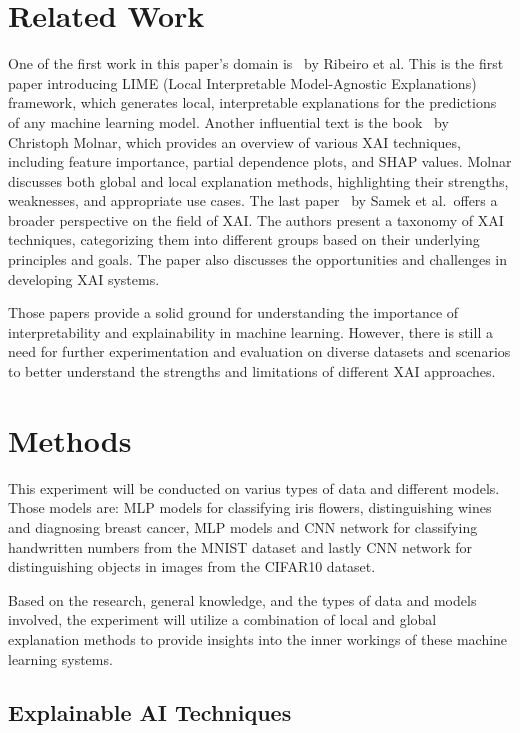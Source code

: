 \documentclass[journal, a4paper]{IEEEtran}
\begin{document}
\section{Related Work}\label{sec:related-work}

One of the first work in this paper's domain is~\cite{ribeiro2016should} by Ribeiro et al.
This is the first paper introducing LIME (Local Interpretable Model-Agnostic Explanations) framework, which generates local, interpretable explanations for the predictions of any machine learning model.
Another influential text is the book~\cite{molnar2019interpretable} by Christoph Molnar, which provides an overview of various XAI techniques, including feature importance, partial dependence plots, and SHAP values.
Molnar discusses both global and local explanation methods, highlighting their strengths, weaknesses, and appropriate use cases.
The last paper~\cite{samek2017explainable} by Samek et al.\ offers a broader perspective on the field of XAI\@.
The authors present a taxonomy of XAI techniques, categorizing them into different groups based on their underlying principles and goals.
The paper also discusses the opportunities and challenges in developing XAI systems.

Those papers provide a solid ground for understanding the importance of interpretability and explainability in machine learning.
However, there is still a need for further experimentation and evaluation on diverse datasets and scenarios to better understand the strengths and limitations of different XAI approaches.

\section{Methods}\label{sec:methodology}

This experiment will be conducted on varius types of data and different models.
Those models are: MLP models for classifying iris flowers, distinguishing wines and diagnosing breast cancer, MLP models and CNN network for classifying handwritten numbers from the MNIST dataset and lastly CNN network for distinguishing objects in images from the CIFAR10 dataset.

Based on the research, general knowledge, and the types of data and models involved, the experiment will utilize a combination of local and global explanation methods to provide insights into the inner workings of these machine learning systems.

\subsection{Explainable AI Techniques}\label{subsec:explainable-ai-techniques}
\end{document}
